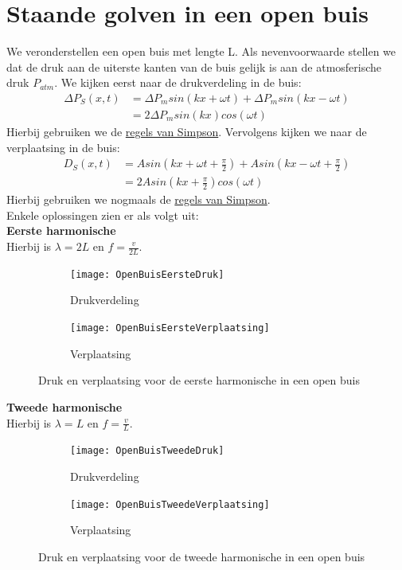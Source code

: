 \documentclass[a4paper,kul]{kulakarticle} %
\begin{document}
\section{Staande golven in een open buis}
We veronderstellen een open buis met lengte L. Als nevenvoorwaarde stellen we dat de druk aan de uiterste kanten van de buis gelijk is aan de atmosferische druk $P_{atm}$. We kijken eerst naar de drukverdeling in de buis:
\begin{align*}
	\Delta P_S (x,t) &= \Delta P_m sin(kx+\omega t) + \Delta P_m sin(kx-\omega t)\\
	&= 2\Delta P_m sin(kx)cos(\omega t)
\end{align*}
Hierbij gebruiken we de \href{https://nl.wikipedia.org/wiki/Lijst_van_goniometrische_gelijkheden#Som-naar-product-identiteiten_(regels_van_Simpson)}{regels van Simpson}. Vervolgens kijken we naar de verplaatsing in de buis:
\begin{align*}
	D_S(x,t)&=Asin(kx+\omega t+\frac{\pi}{2})+Asin(kx-\omega t+\frac{\pi}{2})\\
	&= 2Asin(kx+\frac{\pi}{2})cos(\omega t)
\end{align*}
Hierbij gebruiken we nogmaals de \href{https://nl.wikipedia.org/wiki/Lijst_van_goniometrische_gelijkheden#Som-naar-product-identiteiten_(regels_van_Simpson)}{regels van Simpson}.\\
Enkele oplossingen zien er als volgt uit:\\

\textbf{Eerste harmonische}\\
Hierbij is $\lambda = 2L$ en $f=\frac{v}{2L}$.

\begin{figure}[h]
	\centering
	\begin{subfigure}{.5\textwidth}
		\centering
		\texttt{[image: OpenBuisEersteDruk]}
		\caption{Drukverdeling}
		\label{fig:EersteBuisDruk}
	\end{subfigure}%
	\begin{subfigure}{.5\textwidth}
		\centering
		\texttt{[image: OpenBuisEersteVerplaatsing]}
		\caption{Verplaatsing}
		\label{fig:EersteBuisVerplaatsing}
	\end{subfigure}
	\caption{Druk en verplaatsing voor de eerste harmonische in een open buis}
	\label{fig:OpenBuisEerste}
\end{figure}
\newpage
\textbf{Tweede harmonische}\\
Hierbij is $\lambda = L$ en $f=\frac{v}{L}$.

\begin{figure}[!h]
	\centering
	\begin{subfigure}{.5\textwidth}
		\centering
		\texttt{[image: OpenBuisTweedeDruk]}
		\caption{Drukverdeling}
		\label{fig:TweedeBuisDruk}
	\end{subfigure}%
	\begin{subfigure}{.5\textwidth}
		\centering
		\texttt{[image: OpenBuisTweedeVerplaatsing]}
		\caption{Verplaatsing}
		\label{fig:TweedeBuisVerplaatsing}
	\end{subfigure}
	\caption{Druk en verplaatsing voor de tweede harmonische in een open buis}
	\label{fig:OpenBuisTweede}
\end{figure}
\end{document}
